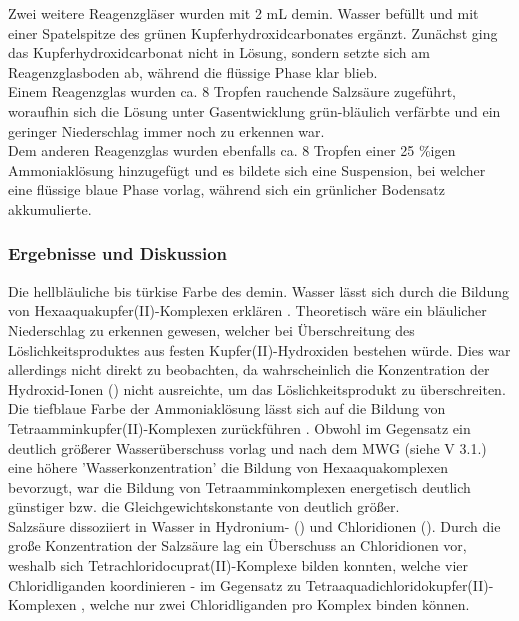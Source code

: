 \documentclass[
	a4paper,										%
	12pt,											%
	twoside,										%
	headsepline,								%
	footsepline,									%
	captions=tableheading,					%
]{scrartcl}
\begin{document}
	Zwei weitere Reagenzgläser wurden mit 2 mL demin. Wasser befüllt und mit einer Spatelspitze des grünen Kupferhydroxidcarbonates ergänzt. Zunächst ging das Kupferhydroxidcarbonat nicht in Lösung,
	sondern setzte sich am Reagenzglasboden ab, während die flüssige Phase klar blieb.\\
	Einem Reagenzglas wurden ca. 8 Tropfen rauchende Salzsäure zugeführt, woraufhin sich die Lösung unter Gasentwicklung grün-bläulich verfärbte und ein geringer Niederschlag immer noch zu erkennen war.\\
	Dem anderen Reagenzglas wurden ebenfalls ca. 8 Tropfen einer 25 \%igen Ammoniaklösung hinzugefügt und es bildete sich eine Suspension,
	bei welcher eine flüssige blaue Phase vorlag, während sich ein grünlicher Bodensatz akkumulierte.

\subsubsection{Ergebnisse und Diskussion}
	Die hellbläuliche bis türkise Farbe des demin. Wasser lässt sich durch die Bildung von Hexaaquakupfer(II)-Komplexen erklären .
	Theoretisch wäre ein bläulicher Niederschlag zu erkennen gewesen, welcher bei Überschreitung des Löslichkeitsproduktes aus festen Kupfer(II)-Hydroxiden  bestehen würde.
	Dies war allerdings nicht direkt zu beobachten, da wahrscheinlich die Konzentration der Hydroxid-Ionen () nicht ausreichte, um das Löslichkeitsprodukt zu überschreiten.\\

	Die tiefblaue Farbe der Ammoniaklösung lässt sich auf die Bildung von Tetraamminkupfer(II)-Komplexen zurückführen .
	Obwohl im Gegensatz ein deutlich größerer Wasserüberschuss vorlag und nach dem MWG (siehe V 3.1.) eine höhere 'Wasserkonzentration' die Bildung von Hexaaquakomplexen bevorzugt,
	war die Bildung von Tetraamminkomplexen energetisch deutlich günstiger bzw. die Gleichgewichtskonstante von  deutlich größer.\\

	Salzsäure dissoziiert in Wasser in Hydronium- () und Chloridionen (). Durch die große Konzentration der Salzsäure lag ein Überschuss an Chloridionen vor,
	weshalb sich Tetrachloridocuprat(II)-Komplexe  bilden konnten, welche vier Chloridliganden koordinieren -
	im Gegensatz zu Tetraaquadichloridokupfer(II)-Komplexen , welche nur zwei Chloridliganden pro Komplex binden können.\\
\end{document}

